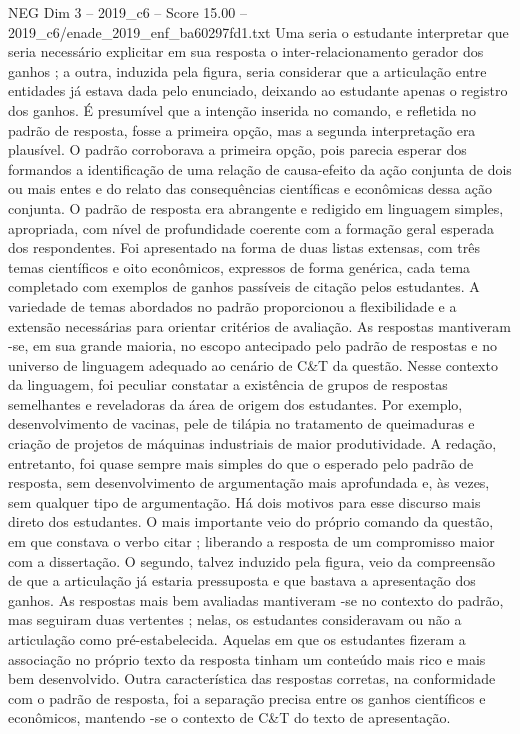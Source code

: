 \begin{textsample}{NEG Dim 3 – 2019\_c6 – Score 15.00 – 2019\_c6/enade\_2019\_enf\_ba60297fd1.txt}
Uma seria o estudante interpretar que seria necessário explicitar em sua resposta o inter-relacionamento gerador dos ganhos ; a outra, induzida pela figura, seria considerar que a articulação entre entidades já estava dada pelo enunciado, deixando ao estudante apenas o registro dos ganhos.
É presumível que a intenção inserida no comando, e refletida no padrão de resposta, fosse a primeira opção, mas a segunda interpretação era plausível.
O padrão corroborava a primeira opção, pois parecia esperar dos formandos a identificação de uma relação de causa-efeito da ação conjunta de dois ou mais entes e do relato das consequências científicas e econômicas dessa ação conjunta.
O padrão de resposta era abrangente e redigido em linguagem simples, apropriada, com nível de profundidade coerente com a formação geral esperada dos respondentes.
Foi apresentado na forma de duas listas extensas, com três temas científicos e oito econômicos, expressos de forma genérica, cada tema completado com exemplos de ganhos passíveis de citação pelos estudantes.
A variedade de temas abordados no padrão proporcionou a flexibilidade e a extensão necessárias para orientar critérios de avaliação.
As respostas mantiveram -se, em sua grande maioria, no escopo antecipado pelo padrão de respostas e no universo de linguagem adequado ao cenário de C\&T da questão.
Nesse contexto da linguagem, foi peculiar constatar a existência de grupos de respostas semelhantes e reveladoras da área de origem dos estudantes.
Por exemplo, desenvolvimento de vacinas, pele de tilápia no tratamento de queimaduras e criação de projetos de máquinas industriais de maior produtividade.
A redação, entretanto, foi quase sempre mais simples do que o esperado pelo padrão de resposta, sem desenvolvimento de argumentação mais aprofundada e, às vezes, sem qualquer tipo de argumentação.
Há dois motivos para esse discurso mais direto dos estudantes.
O mais importante veio do próprio comando da questão, em que constava o verbo citar ; liberando a resposta de um compromisso maior com a dissertação.
O segundo, talvez induzido pela figura, veio da compreensão de que a articulação já estaria pressuposta e que bastava a apresentação dos ganhos.
As respostas mais bem avaliadas mantiveram -se no contexto do padrão, mas seguiram duas vertentes ; nelas, os estudantes consideravam ou não a articulação como pré-estabelecida.
Aquelas em que os estudantes fizeram a associação no próprio texto da resposta tinham um conteúdo mais rico e mais bem desenvolvido.
Outra característica das respostas corretas, na conformidade com o padrão de resposta, foi a separação precisa entre os ganhos científicos e econômicos, mantendo -se o contexto de C\&T do texto de apresentação.

\end{textsample}
